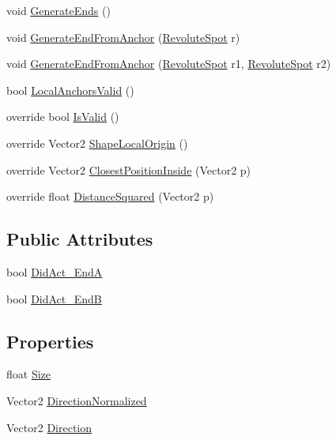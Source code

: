 \begin{DoxyCompactItemize}
\item 
void \hyperlink{classgearit_1_1src_1_1robot_1_1_rod_a405e3a4786b8b80649c6ffa22e3d260c}{Generate\+Ends} ()
\item 
void \hyperlink{classgearit_1_1src_1_1robot_1_1_rod_a1174328824276be5870906c3336bb90d}{Generate\+End\+From\+Anchor} (\hyperlink{classgearit_1_1src_1_1robot_1_1_revolute_spot}{Revolute\+Spot} r)
\item 
void \hyperlink{classgearit_1_1src_1_1robot_1_1_rod_aae0e226c9df9b791c4a07c75482e5551}{Generate\+End\+From\+Anchor} (\hyperlink{classgearit_1_1src_1_1robot_1_1_revolute_spot}{Revolute\+Spot} r1, \hyperlink{classgearit_1_1src_1_1robot_1_1_revolute_spot}{Revolute\+Spot} r2)
\item 
bool \hyperlink{classgearit_1_1src_1_1robot_1_1_rod_aa378c9c716e54ffee86dfa97b4486fba}{Local\+Anchors\+Valid} ()
\item 
override bool \hyperlink{classgearit_1_1src_1_1robot_1_1_rod_ae7aa0ceae5dad57dfb532933d4b1b88d}{Is\+Valid} ()
\item 
override Vector2 \hyperlink{classgearit_1_1src_1_1robot_1_1_rod_a306f2cbfd5a5510f55a17c4b8f07b2ee}{Shape\+Local\+Origin} ()
\item 
override Vector2 \hyperlink{classgearit_1_1src_1_1robot_1_1_rod_ab2b2e91a17d9c39fa36e58667527598b}{Closest\+Position\+Inside} (Vector2 p)
\item 
override float \hyperlink{classgearit_1_1src_1_1robot_1_1_rod_a7103977ea32f5d3f378f46626f885459}{Distance\+Squared} (Vector2 p)
\end{DoxyCompactItemize}
\subsection*{Public Attributes}
\begin{DoxyCompactItemize}
\item 
bool \hyperlink{classgearit_1_1src_1_1robot_1_1_rod_a2589a36457c0b89aad861f8653bd7c75}{Did\+Act\+\_\+\+End\+A}
\item 
bool \hyperlink{classgearit_1_1src_1_1robot_1_1_rod_a6e2c74453ed46d4253e5e33531616ee4}{Did\+Act\+\_\+\+End\+B}
\end{DoxyCompactItemize}
\subsection*{Properties}
\begin{DoxyCompactItemize}
\item 
float \hyperlink{classgearit_1_1src_1_1robot_1_1_rod_ad81d14d21b0fadeea0babed4dd2dd74a}{Size}
\item 
Vector2 \hyperlink{classgearit_1_1src_1_1robot_1_1_rod_a167a5c3f6a6c7706a260fcef37f9f2d3}{Direction\+Normalized}
\item 
Vector2 \hyperlink{classgearit_1_1src_1_1robot_1_1_rod_aeecb39515796a074caf0159df0a8620a}{Direction}
\end{DoxyCompactItemize}


